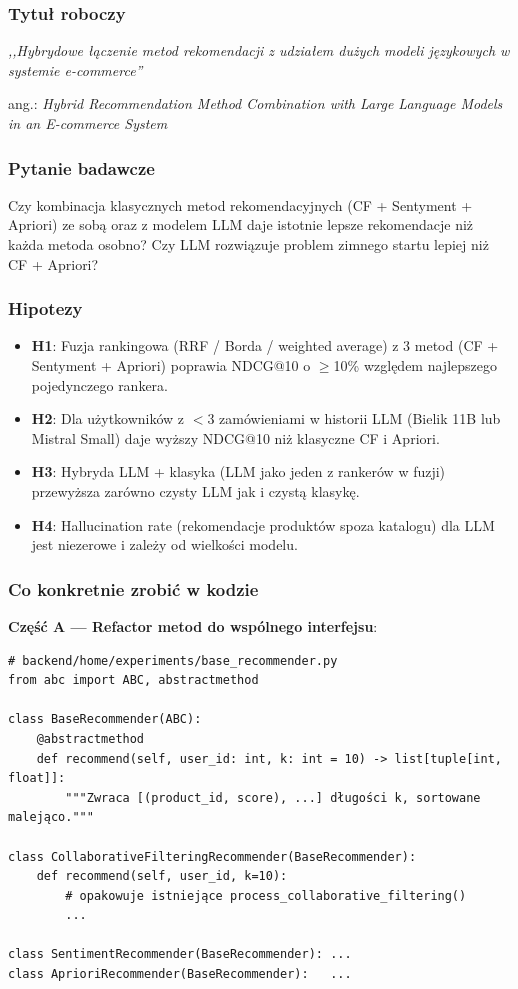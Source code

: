 \documentclass[a4paper,11pt]{article}
\begin{document}
\subsubsection*{Tytuł roboczy}
\noindent\textit{,,Hybrydowe łączenie metod rekomendacji z udziałem dużych modeli językowych w systemie e-commerce''}

\medskip\noindent ang.: \textit{Hybrid Recommendation Method Combination with Large Language Models in an E-commerce System}

\subsubsection*{Pytanie badawcze}

Czy kombinacja klasycznych metod rekomendacyjnych (CF + Sentyment + Apriori) ze sobą oraz z modelem LLM daje istotnie lepsze rekomendacje niż każda metoda osobno? Czy LLM rozwiązuje problem zimnego startu lepiej niż CF + Apriori?

\subsubsection*{Hipotezy}

\begin{itemize}[leftmargin=1.5em,itemsep=2pt]
  \item \textbf{H1}: Fuzja rankingowa (RRF / Borda / weighted average) z 3 metod (CF + Sentyment + Apriori) poprawia NDCG@10 o $\geq$10\% względem najlepszego pojedynczego rankera.
  \item \textbf{H2}: Dla użytkowników z $<$3 zamówieniami w historii LLM (Bielik 11B lub Mistral Small) daje wyższy NDCG@10 niż klasyczne CF i Apriori.
  \item \textbf{H3}: Hybryda LLM + klasyka (LLM jako jeden z rankerów w fuzji) przewyższa zarówno czysty LLM jak i czystą klasykę.
  \item \textbf{H4}: Hallucination rate (rekomendacje produktów spoza katalogu) dla LLM jest niezerowe i zależy od wielkości modelu.
\end{itemize}

\subsubsection*{Co konkretnie zrobić w kodzie}

\textbf{Część A --- Refactor metod do wspólnego interfejsu}:

\begin{lstlisting}
# backend/home/experiments/base_recommender.py
from abc import ABC, abstractmethod

class BaseRecommender(ABC):
    @abstractmethod
    def recommend(self, user_id: int, k: int = 10) -> list[tuple[int, float]]:
        """Zwraca [(product_id, score), ...] długości k, sortowane malejąco."""

class CollaborativeFilteringRecommender(BaseRecommender):
    def recommend(self, user_id, k=10):
        # opakowuje istniejące process_collaborative_filtering()
        ...

class SentimentRecommender(BaseRecommender): ...
class AprioriRecommender(BaseRecommender):   ...
\end{lstlisting}
\end{document}
